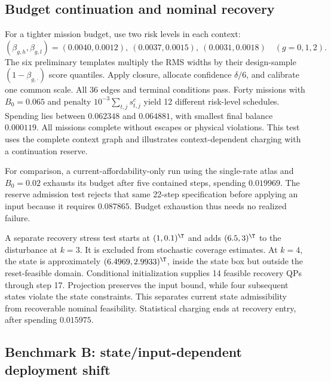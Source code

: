 \subsection{Budget continuation and nominal recovery}
\label{subsec:numeric-operations}

For a tighter mission budget, use two risk levels in each context:
\begin{equation}
 (\beta_{g,h},\beta_{g,l})=
 (0.0040,0.0012),\ (0.0037,0.0015),\ (0.0031,0.0018)
 \quad(g=0,1,2).
 \label{eq:numeric-context-risks}
\end{equation}
The six preliminary templates multiply the RMS widths by their design-sample $(1-\beta_{g,\cdot})$ score quantiles. Apply closure, allocate confidence $\delta/6$, and calibrate one common scale. All 36 edges and terminal conditions pass. Forty missions with $B_0=0.065$ and penalty $10^{-3}\sum_{t,j}s_{t,j}^c$ yield 12 different risk-level schedules. Spending lies between $0.062348$ and $0.064881$, with smallest final balance $0.000119$. All missions complete without escapes or physical violations. This test uses the complete context graph and illustrates context-dependent charging with a continuation reserve.

For comparison, a current-affordability-only run using the single-rate atlas and $B_0=0.02$ exhausts its budget after five contained steps, spending $0.019969$. The reserve admission test rejects that same 22-step specification before applying an input because it requires $0.087865$. Budget exhaustion thus needs no realized failure.

A separate recovery stress test starts at $(1,0.1)^\T$ and adds $(6.5,3)^\T$ to the disturbance at $k=3$. It is excluded from stochastic coverage estimates. At $k=4$, the state is approximately $(6.4969,2.9933)^\T$, inside the state box but outside the reset-feasible domain. Conditional initialization supplies 14 feasible recovery QPs through step 17. Projection preserves the input bound, while four subsequent states violate the state constraints. This separates current state admissibility from recoverable nominal feasibility. Statistical charging ends at recovery entry, after spending $0.015975$.

\subsection{Benchmark B: state/input-dependent deployment shift}
\label{subsec:numeric-B}

